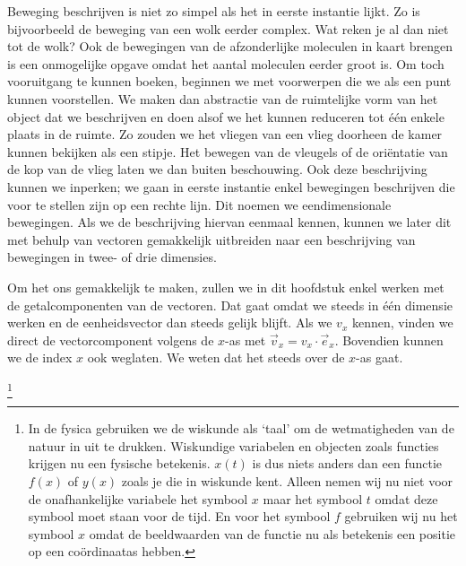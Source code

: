 \documentclass{ximera}
\begin{document}
	\author{Bart Lambregs}
    \xmsource\xmuitleg


	Beweging beschrijven is niet zo simpel als het in eerste instantie lijkt. Zo is bijvoorbeeld de beweging van een wolk eerder complex. Wat reken je al dan niet tot de wolk? Ook de bewegingen van de afzonderlijke moleculen in kaart brengen is een onmogelijke opgave omdat het aantal moleculen eerder groot is. Om toch vooruitgang te kunnen boeken, beginnen we met voorwerpen die we als een punt kunnen voorstellen. We maken dan abstractie van de ruimtelijke vorm van het object dat we beschrijven en doen alsof we het kunnen reduceren tot \'e\'en enkele plaats in de ruimte. Zo zouden we het vliegen van een vlieg doorheen de kamer kunnen bekijken als een stipje. Het bewegen van de vleugels of de oriëntatie van de kop van de vlieg laten we dan buiten beschouwing. Ook deze beschrijving kunnen we inperken; we gaan in eerste instantie enkel bewegingen beschrijven die voor te stellen zijn op een rechte lijn. Dit noemen we eendimensionale bewegingen. Als we de beschrijving hiervan eenmaal kennen, kunnen we later dit met behulp van vectoren gemakkelijk uitbreiden naar een beschrijving van bewegingen in twee- of drie dimensies.
	
	Om het ons gemakkelijk te maken, zullen we in dit hoofdstuk enkel werken met de getalcomponenten van de vectoren. Dat gaat omdat we steeds in \'e\'en dimensie werken en de eenheidsvector dan steeds gelijk blijft. Als we $v_x$ kennen, vinden we direct de vectorcomponent volgens de $x$-as met $\vec{v}_x=v_x\cdot\vec{e}_x$. Bovendien kunnen we de index $x$ ook weglaten. We weten dat het steeds over de $x$-as gaat.
	
	
	\footnote{In de fysica gebruiken we de wiskunde als `taal' om de wetmatigheden van de natuur in uit te drukken. Wiskundige variabelen en objecten zoals functies krijgen nu een fysische betekenis. $x(t)$ is dus niets anders dan een functie $f(x)$ of $y(x)$ zoals je die in wiskunde kent. Alleen nemen wij nu niet voor de onafhankelijke variabele het symbool $x$ maar het symbool $t$ omdat deze symbool moet staan voor de tijd. En voor het symbool $f$ gebruiken wij nu het symbool $x$ omdat de beeldwaarden van de functie nu als betekenis een positie op een coördinaatas hebben.}
	
\end{document}
